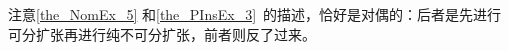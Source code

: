 注意\autoref{the_NomEx_5} 和\autoref{the_PInsEx_3}~的描述，恰好是对偶的：后者是先进行可分扩张再进行纯不可分扩张，前者则反了过来。






























